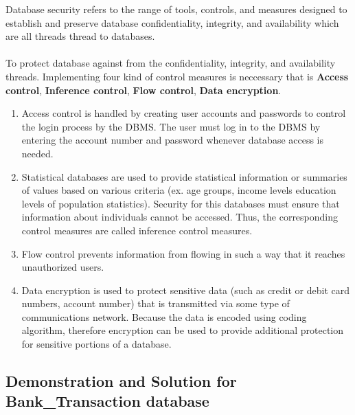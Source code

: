 \documentclass[12pt,a4paper]{article}
\begin{document}
 \indent Database security refers to the range of tools, 
 controls, and measures designed to establish and preserve 
 database confidentiality, integrity, and availability which 
 are all threads thread to databases.\\\\
 \indent To protect database against from the confidentiality, integrity, and availability threads. Implementing four kind of control measures is neccessary 
 that is \textbf{Access control}, \textbf{Inference control}, \textbf{Flow control}, \textbf{Data encryption}.
 
 \begin{enumerate}
     \item Access control is handled by creating user accounts
and passwords to control the login process by the DBMS. The user must log in to the DBMS by entering the account number and password whenever database access is needed.
    \item Statistical databases are used to provide statistical information or summaries of values based on various criteria (ex. age groups, income levels
    education levels of population statistics). Security for this databases must ensure that information about individuals cannot be accessed. Thus, the corresponding control measures are called inference control measures.
    \item Flow control prevents information from
flowing in such a way that it reaches unauthorized users.
    \item Data encryption is used to protect sensitive data
(such as credit or debit card numbers, account number) that is transmitted via some type of communications
network. Because the data is encoded using coding algorithm, therefore encryption can be used to provide additional protection for sensitive portions of a database.
 \end{enumerate}
 
 \subsection{Demonstration and Solution for Bank\_Transaction database}
 
\end{document}
